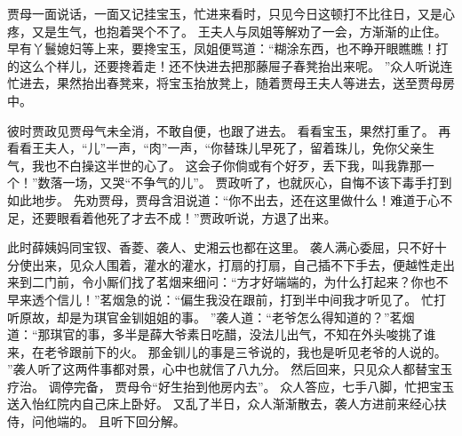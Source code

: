 贾母一面说话，一面又记挂宝玉，忙进来看时，只见今日这顿打不比往日，又是心疼，又是生气，也抱着哭个不了。
王夫人与凤姐等解劝了一会，方渐渐的止住。
早有丫鬟媳妇等上来，要搀宝玉，凤姐便骂道：“糊涂东西，也不睁开眼瞧瞧！打的这么个样儿，还要搀着走！还不快进去把那藤屉子春凳抬出来呢。
”众人听说连忙进去，果然抬出春凳来，将宝玉抬放凳上，随着贾母王夫人等进去，送至贾母房中。
\par
彼时贾政见贾母气未全消，不敢自便，也跟了进去。
看看宝玉，果然打重了。
再看看王夫人，“儿”一声，“肉”一声，“你替珠儿早死了，留着珠儿，免你父亲生气，我也不白操这半世的心了。
这会子你倘或有个好歹，丢下我，叫我靠那一个！”数落一场，又哭“不争气的儿”。
贾政听了，也就灰心，自悔不该下毒手打到如此地步。
先劝贾母，贾母含泪说道：“你不出去，还在这里做什么！难道于心不足，还要眼看着他死了才去不成！”贾政听说，方退了出来。
\par
此时薛姨妈同宝钗、香菱、袭人、史湘云也都在这里。
袭人满心委屈，只不好十分使出来，见众人围着，灌水的灌水，打扇的打扇，自己插不下手去，便越性走出来到二门前，令小厮们找了茗烟来细问：“方才好端端的，为什么打起来？你也不早来透个信儿！”茗烟急的说：“偏生我没在跟前，打到半中间我才听见了。
忙打听原故，却是为琪官金钏姐姐的事。
”袭人道：“老爷怎么得知道的？”茗烟道：“那琪官的事，多半是薛大爷素日吃醋，没法儿出气，不知在外头唆挑了谁来，在老爷跟前下的火。
那金钏儿的事是三爷说的，我也是听见老爷的人说的。
”袭人听了这两件事都对景，心中也就信了八九分。
然后回来，只见众人都替宝玉疗治。
调停完备，
贾母令“好生抬到他房内去”。
众人答应，七手八脚，忙把宝玉送入怡红院内自己床上卧好。
又乱了半日，众人渐渐散去，袭人方进前来经心扶侍，问他端的。
且听下回分解。
\par
{}
